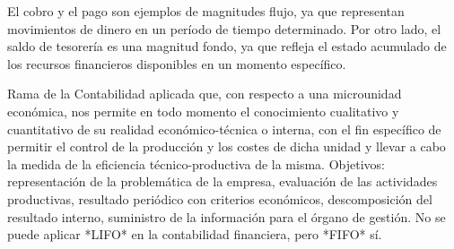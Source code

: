 \documentclass[12pt]{report} %
\begin{document}
\begin{ejemplo}
El cobro y el pago son ejemplos de magnitudes flujo, ya que representan movimientos de dinero en un período de tiempo determinado. Por otro lado, el saldo de tesorería es una magnitud fondo, ya que refleja el estado acumulado de los recursos financieros disponibles en un momento específico.
\end{ejemplo}


\begin{definicion}
Rama de la Contabilidad aplicada que, con respecto a una microunidad económica, nos permite en todo momento el conocimiento cualitativo y cuantitativo de su realidad económico-técnica o interna, con el fin específico de permitir el control de la producción y los costes de dicha unidad y llevar a cabo la medida de la eficiencia técnico-productiva de la misma. Objetivos: representación de la problemática de la empresa, evaluación de las actividades productivas, resultado periódico con criterios económicos, descomposición del resultado interno, suministro de la información para el órgano de gestión. No se puede aplicar *LIFO* en la contabilidad financiera, pero *FIFO* sí.
\end{definicion}


\end{document}
